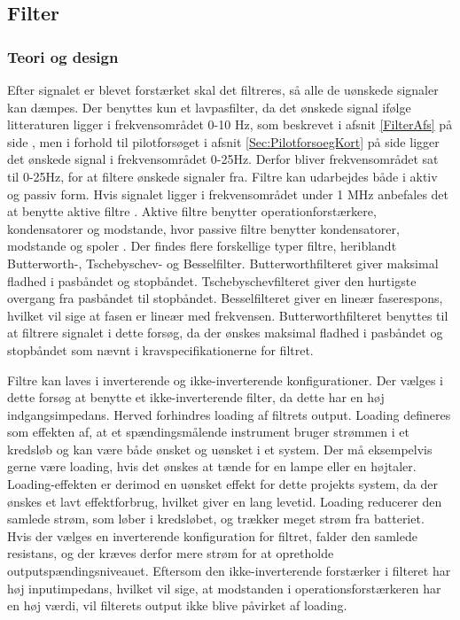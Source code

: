 \subsection{Filter}
\subsubsection{Teori og design}
Efter signalet er blevet forstærket skal det filtreres, så alle de uønskede signaler kan dæmpes. Der benyttes kun et lavpasfilter, da det ønskede signal ifølge litteraturen ligger i frekvensområdet 0-10 Hz, som beskrevet i afsnit \ref{FilterAfs} på side \pageref{FilterAfs}, men i forhold til pilotforsøget i afsnit \ref{Sec:PilotforsoegKort} på side \pageref{Sec:Pilotforsoeg} ligger det ønskede signal i frekvensområdet 0-25Hz. Derfor bliver frekvensområdet sat til 0-25Hz, for at filtere ønskede signaler fra. Filtre kan udarbejdes både i aktiv og passiv form. Hvis signalet ligger i frekvensområdet under 1 MHz anbefales det at benytte aktive filtre \cite{Carter2013}. Aktive filtre benytter operationforstærkere, kondensatorer og modstande, hvor passive filtre benytter kondensatorer, modstande og spoler \cite{Carter2013}. Der findes flere forskellige typer filtre, heriblandt Butterworth-, Tschebyschev- og Besselfilter. Butterworthfilteret giver maksimal fladhed i pasbåndet og stopbåndet. Tschebyschevfilteret giver den hurtigste overgang fra pasbåndet til stopbåndet. Besselfilteret giver en lineær faserespons, hvilket vil sige at fasen er lineær med frekvensen. \cite{Carter2013} Butterworthfilteret benyttes til at filtrere signalet i dette forsøg, da der ønskes maksimal fladhed i pasbåndet og stopbåndet som nævnt i kravspecifikationerne for filtret.

Filtre kan laves i inverterende og ikke-inverterende konfigurationer. Der vælges i dette forsøg at benytte et ikke-inverterende filter, da dette har en høj indgangsimpedans. Herved forhindres loading af filtrets output. Loading defineres som effekten af, at et spændingsmålende instrument bruger strømmen i et kredsløb og kan være både ønsket og uønsket i et system. Der må eksempelvis gerne være loading, hvis det ønskes at tænde for en lampe eller en højtaler. Loading-effekten er derimod en uønsket effekt for dette projekts system, da der ønskes et lavt effektforbrug, hvilket giver en lang levetid. Loading reducerer den samlede strøm, som løber i kredsløbet, og trækker meget strøm fra batteriet. \\
Hvis der vælges en inverterende konfiguration for filtret, falder den samlede resistans, og der kræves derfor mere strøm for at opretholde outputspændingsniveauet. Eftersom den ikke-inverterende forstærker i filteret har høj inputimpedans, hvilket vil sige, at modstanden i operationsforstærkeren har en høj værdi, vil filterets output ikke blive påvirket af loading. \cite{Webster2009,Carter2013,Karni2014}

